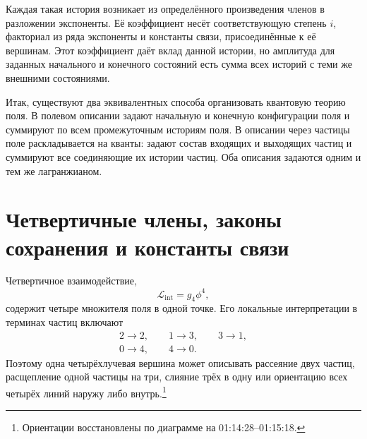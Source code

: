 Каждая такая история возникает из определённого произведения членов в разложении экспоненты. Её коэффициент несёт соответствующую степень \(i\), факториал из ряда экспоненты и константы связи, присоединённые к её вершинам. Этот коэффициент даёт вклад данной истории, но амплитуда для заданных начального и конечного состояний есть сумма всех историй с теми же внешними состояниями.

\begin{classroomqa}
\end{classroomqa}

Итак, существуют два эквивалентных способа организовать квантовую теорию поля. В полевом описании задают начальную и конечную конфигурации поля и суммируют по всем промежуточным историям поля. В описании через частицы поле раскладывается на кванты: задают состав входящих и выходящих частиц и суммируют все соединяющие их истории частиц. Оба описания задаются одним и тем же лагранжианом.

\section{Четвертичные члены, законы сохранения и константы связи}

Четвертичное взаимодействие,
\begin{equation}
\mathcal{L}_{\mathrm{int}}=g_4\phi^4,
\end{equation}
содержит четыре множителя поля в одной точке. Его локальные интерпретации в терминах частиц включают
\begin{equation}
\begin{gathered}
2\longrightarrow2,
\qquad
1\longrightarrow3,
\qquad
3\longrightarrow1,\\
0\longrightarrow4,
\qquad
4\longrightarrow0.
\end{gathered}
\end{equation}
Поэтому одна четырёхлучевая вершина может описывать рассеяние двух частиц, расщепление одной частицы на три, слияние трёх в одну или ориентацию всех четырёх линий наружу либо внутрь.\footnote{Ориентации восстановлены по диаграмме на 01:14:28--01:15:18.}

